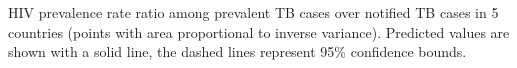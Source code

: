 \label{fig:hivratio}HIV prevalence rate ratio among prevalent TB cases over notified TB cases in 5 countries (points with area proportional to inverse variance). Predicted values are shown with a solid line, the dashed lines represent 95\% confidence bounds.